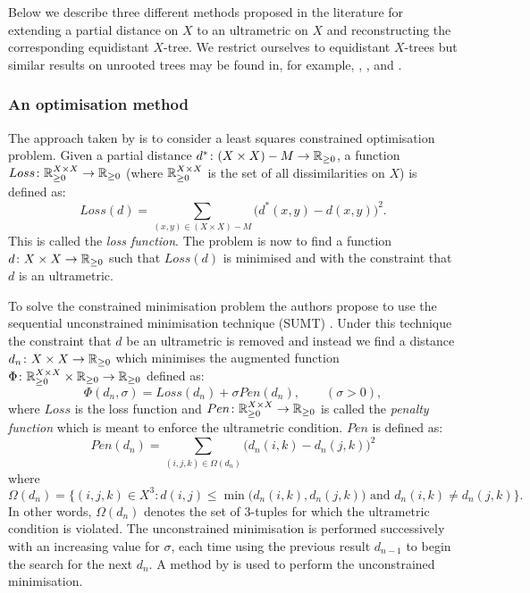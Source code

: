 Below we describe three different methods proposed in the literature for
extending a partial distance on $X$ to an ultrametric on $X$ and
reconstructing the corresponding equidistant $X$-tree.  We restrict ourselves
to equidistant $X$-trees but similar results on unrooted trees may be found
in, for example, \cite{guenoche1999approximations}, \cite{farach1995robust},
\cite{makarenkov2001nouvelle} and \cite{guenoche2004extension}.

\subsubsection{An optimisation method}
\label{sec:part-dist-optim-method}

The approach taken by \citet{de1984ultrametric} is to consider a least squares
constrained optimisation problem.  Given a partial distance $d^* \colon (X
\times X) - M \to {\mathbb R}_{\geq 0}$, a function $Loss \colon {\mathbb R}_{\geq 0}^{X \times X} \to
{\mathbb R}_{\geq 0}$ (where ${\mathbb R}_{\geq 0}^{X \times X}$ is the set of all dissimilarities on $X$)
is defined as:
\begin{equation*}
  \label{eq:partial-dist-least-squares}
  Loss(d) = \sum_{(x,y) \in (X \times X) - M} \!\big(d^*(x,y)-d(x,y)\big)^2.
\end{equation*}
This is called the \textit{loss function}.  The problem is now to find a
function $d \colon X \times X \to {\mathbb R}_{\geq 0}$ such that $Loss(d)$ is minimised and
with the constraint that $d$ is an ultrametric.

To solve the constrained minimisation problem the authors propose to use the
sequential unconstrained minimisation technique (SUMT)
\cite{fiacco1964sequential}.  Under this technique the constraint that $d$ be
an ultrametric is removed and instead we find a distance $d_n \colon X \times
X \to {\mathbb R}_{\geq 0}$ which minimises the augmented function $\Phi \colon {\mathbb R}_{\geq 0}^{X
  \times X} \times {\mathbb R}_{\geq 0} \to {\mathbb R}_{\geq 0}$ defined as:
\begin{equation*}
  \label{eq:partial-dist-optimisation}
  \Phi(d_n,\sigma) = Loss(d_n) + \sigma Pen(d_n), \qquad (\sigma > 0),
\end{equation*}
where $Loss$ is the loss function and $Pen \colon {\mathbb R}_{\geq 0}^{X \times X} \to
{\mathbb R}_{\geq 0}$ is called the \textit{penalty function} which is meant to enforce the
ultrametric condition.  $Pen$ is defined as:
\begin{equation*}
  \label{eq:penalty-function}
  Pen(d_n) = \sum_{(i,j,k) \in \Omega(d_n)} \! \big(d_n(i,k) - d_n(j,k)\big)^2
\end{equation*}
where
\begin{equation*}
  \Omega(d_n) = \{(i,j,k) \in X^3 \colon d(i,j) \leq \min\big(d_n(i,k),d_n(j,k)\big)
  \text{ and } d_n(i,k) \neq d_n(j,k)\}.
\end{equation*}
In other words, $\Omega(d_n)$ denotes the set of $3$-tuples for which the
ultrametric condition is violated.  The unconstrained minimisation is
performed successively with an increasing value for $\sigma$, each time using
the previous result $d_{n-1}$ to begin the search for the next $d_n$.  A
method by \cite{powell1977restart} is used to perform the unconstrained
minimisation.

